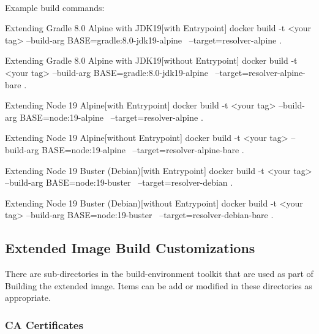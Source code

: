 \noindent\\Example build commands:

\begin{code}{Extending Gradle 8.0 Alpine with JDK19}{[with Entrypoint]}{}
docker build -t <your tag> --build-arg BASE=gradle:8.0-jdk19-alpine \
    --target=resolver-alpine .
\end{code}

\begin{code}{Extending Gradle 8.0 Alpine with JDK19}{[without Entrypoint]}{}
docker build -t <your tag> --build-arg BASE=gradle:8.0-jdk19-alpine \
    --target=resolver-alpine-bare .
\end{code}

\begin{code}{Extending Node 19 Alpine}{[with Entrypoint]}{}
docker build -t <your tag> --build-arg BASE=node:19-alpine \
    --target=resolver-alpine .
\end{code}

\begin{code}{Extending Node 19 Alpine}{[without Entrypoint]}{}
docker build -t <your tag> --build-arg BASE=node:19-alpine \
    --target=resolver-alpine-bare .
\end{code}
    
\begin{code}{Extending Node 19 Buster (Debian)}{[with Entrypoint]}{}
    docker build -t <your tag> --build-arg BASE=node:19-buster \
        --target=resolver-debian .
\end{code}

\begin{code}{Extending Node 19 Buster (Debian)}{[without Entrypoint]}{}
docker build -t <your tag> --build-arg BASE=node:19-buster \
    --target=resolver-debian-bare .
\end{code}

\subsection{Extended Image Build Customizations}

There are sub-directories in the build-environment toolkit that are used as part of Building
the extended image.  Items can be add or modified in these directories as appropriate.

\subsubsection{CA Certificates}

